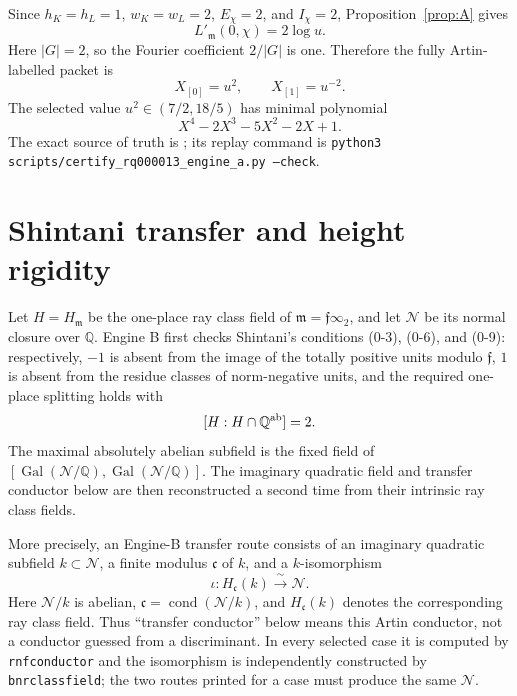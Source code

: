 \documentclass[11pt]{article}
\newcommand{\Q}{\mathbb Q}
\newcommand{\Gal}{\operatorname{Gal}}
\begin{document}
Since \(h_K=h_L=1\), \(w_K=w_L=2\), \(E_\chi=2\), and \(I_\chi=2\),
Proposition~\ref{prop:A} gives
\[
 L'_{\mathfrak m}(0,\chi)=2\log u.
\]
Here \(|G|=2\), so the Fourier coefficient \(2/|G|\) is one.
Therefore the fully Artin-labelled packet is
\[
 \boxed{X_{[0]}=u^2,\qquad X_{[1]}=u^{-2}.}
\]
The selected value \(u^2\in(7/2,18/5)\) has minimal polynomial
\[
 X^4-2X^3-5X^2-2X+1.
\]
The exact source of truth is
;
its replay command is
\texttt{python3 scripts/certify\_rq000013\_engine\_a.py --check}.

\section{Shintani transfer and height rigidity}\label{sec:shintani}

Let \(H=H_{\mathfrak m}\) be the one-place ray class field of
\(\mathfrak m=\mathfrak f\infty_2\), and let \(\mathcal N\) be its
normal closure over \(\Q\).  Engine B first checks Shintani's
conditions (0-3), (0-6), and (0-9): respectively, \(-1\) is absent
from the image of the totally positive units modulo \(\mathfrak f\),
\(1\) is absent from the residue classes of norm-negative units, and
the required one-place splitting holds with
\begin{equation}\label{eq:index-two}
 [H:H\cap\Q^{\rm ab}]=2.
\end{equation}
The maximal absolutely abelian subfield is the fixed field of
\([\Gal(\mathcal N/\Q),\Gal(\mathcal N/\Q)]\).  The imaginary
quadratic field and transfer conductor below are then reconstructed a
second time from their intrinsic ray class fields.

More precisely, an Engine-B transfer route consists of an imaginary
quadratic subfield \(k\subset\mathcal N\), a finite modulus
\(\mathfrak c\) of \(k\), and a \(k\)-isomorphism
\[
 \iota:H_{\mathfrak c}(k)\xrightarrow{\;\sim\;}\mathcal N.
\]
Here \(\mathcal N/k\) is abelian,
\(\mathfrak c=\operatorname{cond}(\mathcal N/k)\), and
\(H_{\mathfrak c}(k)\) denotes the corresponding ray class field.
Thus ``transfer conductor'' below means this Artin conductor, not a
conductor guessed from a discriminant.  In every selected case it is
computed by \texttt{rnfconductor} and the isomorphism is independently
constructed by \texttt{bnrclassfield}; the two routes printed for a
case must produce the same \(\mathcal N\).
\end{document}
